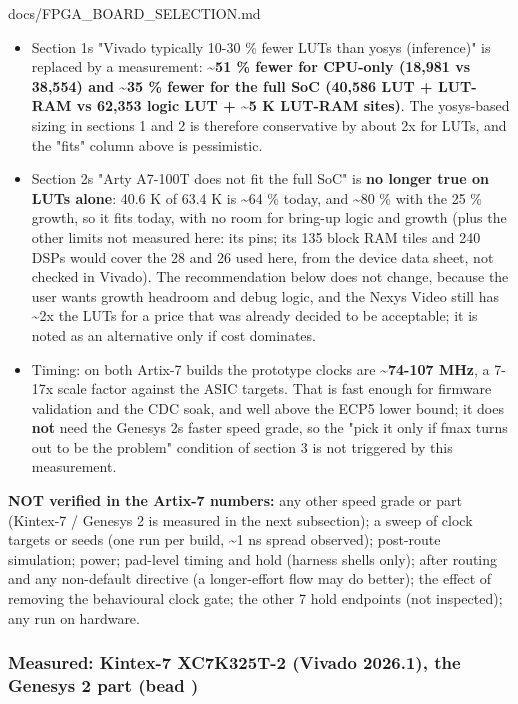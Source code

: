 \begin{relocated}{docs/FPGA_BOARD_SELECTION.md}
\begin{itemize}
\tightlist
\item
  Section 1\textquotesingle s "Vivado typically 10-30 \% fewer LUTs than
  yosys (inference)" is replaced by a measurement:
  \textbf{\textasciitilde51 \% fewer for CPU-only (18,981 vs 38,554) and
  \textasciitilde35 \% fewer for the full SoC (40,586 LUT + LUT-RAM vs
  62,353 logic LUT + \textasciitilde5 K LUT-RAM sites)}. The yosys-based
  sizing in sections 1 and 2 is therefore conservative by about 2x for
  LUTs, and the "fits" column above is pessimistic.
\item
  Section 2\textquotesingle s "Arty A7-100T does not fit the full SoC"
  is \textbf{no longer true on LUTs alone}: 40.6 K of 63.4 K is
  \textasciitilde64 \% today, and \textasciitilde80 \% with the 25 \%
  growth, so it fits today, with no room for bring-up logic and growth
  (plus the other limits not measured here: its pins; its 135 block RAM
  tiles and 240 DSPs would cover the 28 and 26 used here, from the
  device data sheet, not checked in Vivado). The recommendation below
  does not change, because the user wants growth headroom and debug
  logic, and the Nexys Video still has \textasciitilde2x the LUTs for a
  price that was already decided to be acceptable; it is noted as an
  alternative only if cost dominates.
\item
  Timing: on both Artix-7 builds the prototype clocks are
  \textbf{\textasciitilde74-107 MHz}, a 7-17x scale factor against the
  ASIC targets. That is fast enough for firmware validation and the CDC
  soak, and well above the ECP5 lower bound; it does \textbf{not} need
  the Genesys 2\textquotesingle s faster speed grade, so the "pick it
  only if fmax turns out to be the problem" condition of section 3 is
  not triggered by this measurement.
\end{itemize}

\textbf{NOT verified in the Artix-7 numbers:} any other speed grade or
part (Kintex-7 / Genesys 2 is measured in the next subsection); a sweep
of clock targets or seeds (one run per build, \textasciitilde1 ns spread
observed); post-route simulation; power; pad-level timing and hold
(harness shells only);  after routing and any
non-default directive (a longer-effort flow may do better); the effect
of removing the behavioural clock gate; the other 7 hold endpoints (not
inspected); any run on hardware.

\subsubsection{\texorpdfstring{Measured: Kintex-7 XC7K325T-2 (Vivado
2026.1), the Genesys 2 part (bead
)}{Measured: Kintex-7 XC7K325T-2 (Vivado 2026.1), the Genesys 2 part (bead )}}\label{tm:dec:fpga-board-selection:measured-kintex-7-xc7k325t-2-vivado-20261-the-genesys-2-part-bead-hlrm1}


\end{relocated}
